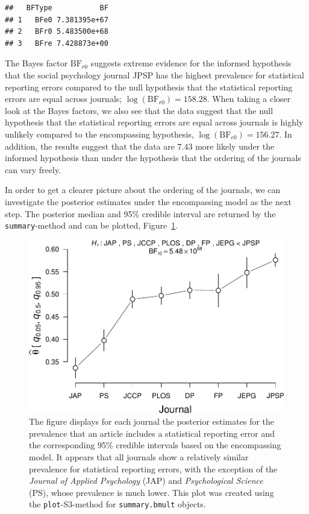 \documentclass[
  english,
  man,floatsintext]{apa6}
\begin{document}
\begin{verbatim}
##   BFType           BF
## 1   BFe0 7.381395e+67
## 2   BFr0 5.483500e+68
## 3   BFre 7.428873e+00
\end{verbatim}

The Bayes factor \(\text{BF}_{r0}\) suggests extreme evidence for the informed hypothesis that the social psychology journal JPSP has the highest prevalence for statistical reporting errors compared to the null hypothesis that the statistical reporting errors are equal across journals; \(\log(\text{BF}_{r0}) = 158.28\).
When taking a closer look at the Bayes factors, we also see that the data suggest that the null hypothesis that the statistical reporting errors are equal across journals is highly unlikely compared to the encompassing hypothesis, \(\log(\text{BF}_{e0}) = 156.27\). In addition, the results suggest that the data are \(7.43\) more likely under the informed hypothesis than under the hypothesis that the ordering of the journals can vary freely.

In order to get a clearer picture about the ordering of the journals, we can investigate the posterior estimates
under the encompassing model as the next step. The posterior median and 95\% credible interval are returned by the \texttt{summary}-method and can be plotted, Figure~\ref{fig:journals}.



\begin{figure}
\centering
\includegraphics{Rpackage_paper_files/figure-latex/journals-1.pdf}
\caption{\label{fig:journals}The figure displays for each journal the posterior estimates for the prevalence that an article includes a statistical reporting error and the corresponding 95\% credible intervals based on the encompassing model. It appears that all journals show a relatively similar prevalence for statistical reporting errors, with the exception of the \emph{Journal of Applied Psychology} (JAP) and \emph{Psychological Science} (PS), whose prevalence is much lower. This plot was created using the \texttt{plot}-S3-method for \texttt{summary.bmult} objects.}
\end{figure}
\end{document}
